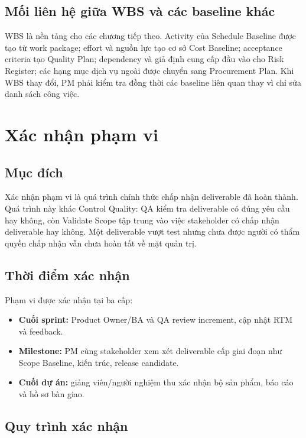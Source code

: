 \subsection{Mối liên hệ giữa WBS và các baseline khác}

WBS là nền tảng cho các chương tiếp theo. Activity của Schedule Baseline được tạo từ work package; effort và nguồn lực tạo cơ sở Cost Baseline; acceptance criteria tạo Quality Plan; dependency và giả định cung cấp đầu vào cho Risk Register; các hạng mục dịch vụ ngoài được chuyển sang Procurement Plan. Khi WBS thay đổi, PM phải kiểm tra đồng thời các baseline liên quan thay vì chỉ sửa danh sách công việc.

\fi
\section{Xác nhận phạm vi}
\iffalse

\subsection{Mục đích}

Xác nhận phạm vi là quá trình chính thức chấp nhận deliverable đã hoàn thành. Quá trình này khác Control Quality: QA kiểm tra deliverable có đúng yêu cầu hay không, còn Validate Scope tập trung vào việc stakeholder có chấp nhận deliverable hay không. Một deliverable vượt test nhưng chưa được người có thẩm quyền chấp nhận vẫn chưa hoàn tất về mặt quản trị.

\subsection{Thời điểm xác nhận}

Phạm vi được xác nhận tại ba cấp:

\begin{itemize}
  \item \textbf{Cuối sprint:} Product Owner/BA và QA review increment, cập nhật RTM và feedback.
  \item \textbf{Milestone:} PM cùng stakeholder xem xét deliverable cấp giai đoạn như Scope Baseline, kiến trúc, release candidate.
  \item \textbf{Cuối dự án:} giảng viên/người nghiệm thu xác nhận bộ sản phẩm, báo cáo và hồ sơ bàn giao.
\end{itemize}

\subsection{Quy trình xác nhận}

